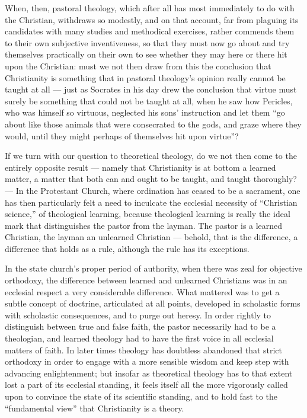 \documentclass[12pt,a4paper]{book}
\begin{document}
When, then, pastoral theology, which after all has most immediately to do with the Christian,
withdraws so modestly, and on that account, far from plaguing its candidates with many studies
and methodical exercises, rather commends them to their own subjective inventiveness, so that
they must now go about and try themselves practically on their own to see whether they may here
or there hit upon the Christian: must we not then draw from this the conclusion that Christianity
is something that in pastoral theology's opinion really cannot be taught at all --- just as
Socrates in his day drew the conclusion that virtue must surely be something that could not be
taught at all, when he saw how Pericles, who was himself so virtuous, neglected his sons'
instruction and let them ``go about like those animals that were consecrated to the gods, and
graze where they would, until they might perhaps of themselves hit upon virtue''?

If we turn with our question to theoretical theology, do we not then come to the entirely
opposite result --- namely that Christianity is at bottom a learned matter, a matter that both
can and ought to be taught, and taught thoroughly? --- In the Protestant Church, where ordination
has ceased to be a sacrament, one has then particularly felt a need to inculcate the ecclesial
necessity of ``Christian science,'' of theological learning, because theological learning is
really the ideal mark that distinguishes the pastor from the layman. The pastor is a learned
Christian, the layman an unlearned Christian --- behold, that is the difference, a difference that
holds as a rule, although the rule has its exceptions.

In the state church's proper period of authority, when there was zeal for objective orthodoxy,
the difference between learned and unlearned Christians was in an ecclesial respect a very
considerable difference. What mattered was to get a subtle concept of doctrine, articulated at
all points, developed in scholastic forms with scholastic consequences, and to purge out heresy.
In order rightly to distinguish between true and false faith, the pastor necessarily had to be a
theologian, and learned theology had to have the first voice in all ecclesial matters of faith.
In later times theology has doubtless abandoned that strict orthodoxy in order to engage with a
more sensible wisdom and keep step with advancing enlightenment; but insofar as theoretical
theology has to that extent lost a part of its ecclesial standing, it feels itself all the more
vigorously called upon to convince the state of its scientific standing, and to hold fast to the
``fundamental view'' that Christianity is a theory.
\end{document}
